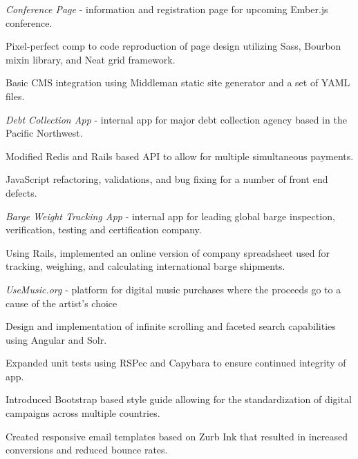 \documentclass[]{deedy-resume-openfont}
\begin{document}
\begin{minipage}[t]{0.66\textwidth}
\textit{Conference Page} - information and registration page for upcoming Ember.js conference.
\begin{tightemize}
\item Pixel-perfect comp to code reproduction of page design utilizing Sass, Bourbon mixin library, and Neat grid framework.
\item Basic CMS integration using Middleman static site generator and a set of YAML files.
\end{tightemize}
\textit{Debt Collection App} - internal app for major debt collection agency based in the Pacific Northwest.
\begin{tightemize}
\item Modified Redis and Rails based API to allow for multiple simultaneous payments.
\item JavaScript refactoring, validations, and bug fixing for a number of front end defects.
\end{tightemize}
\textit{Barge Weight Tracking App} - internal app for leading global barge inspection, verification, testing and certification company.
\begin{tightemize}
\item Using Rails, implemented an online version of company spreadsheet used for tracking, weighing, and calculating international barge shipments.
\end{tightemize}
\textit{UseMusic.org} - platform for digital music purchases where the proceeds go to a cause of the artist’s choice
\begin{tightemize}
\item Design and implementation of infinite scrolling and faceted search capabilities using Angular and Solr.
\item Expanded unit tests using RSPec and Capybara to ensure continued integrity of app.
\end{tightemize}
\sectionsep

\begin{tightemize}
\item Introduced Bootstrap based style guide allowing for the standardization of digital campaigns across multiple countries.
\item Created responsive email templates based on Zurb Ink that resulted in increased conversions and reduced bounce rates.
\end{tightemize}
\sectionsep


\end{minipage}
\end{document}

